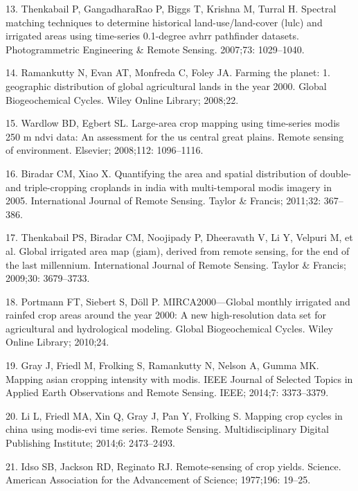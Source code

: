 \documentclass[10pt,letterpaper]{article}
\begin{document}
\hypertarget{ref-thenkabail2007spectral}{}
13. Thenkabail P, GangadharaRao P, Biggs T, Krishna M, Turral H.
Spectral matching techniques to determine historical land-use/land-cover
(lulc) and irrigated areas using time-series 0.1-degree avhrr pathfinder
datasets. Photogrammetric Engineering \& Remote Sensing. 2007;73:
1029--1040.

\hypertarget{ref-ramankutty2008farming}{}
14. Ramankutty N, Evan AT, Monfreda C, Foley JA. Farming the planet: 1.
geographic distribution of global agricultural lands in the year 2000.
Global Biogeochemical Cycles. Wiley Online Library; 2008;22.

\hypertarget{ref-wardlow2008large}{}
15. Wardlow BD, Egbert SL. Large-area crop mapping using time-series
modis 250 m ndvi data: An assessment for the us central great plains.
Remote sensing of environment. Elsevier; 2008;112: 1096--1116.

\hypertarget{ref-biradar2011quantifying}{}
16. Biradar CM, Xiao X. Quantifying the area and spatial distribution of
double-and triple-cropping croplands in india with multi-temporal modis
imagery in 2005. International Journal of Remote Sensing. Taylor \&
Francis; 2011;32: 367--386.

\hypertarget{ref-thenkabail2009global}{}
17. Thenkabail PS, Biradar CM, Noojipady P, Dheeravath V, Li Y, Velpuri
M, et al. Global irrigated area map (giam), derived from remote sensing,
for the end of the last millennium. International Journal of Remote
Sensing. Taylor \& Francis; 2009;30: 3679--3733.

\hypertarget{ref-portmann2010mirca2000}{}
18. Portmann FT, Siebert S, Döll P. MIRCA2000---Global monthly irrigated
and rainfed crop areas around the year 2000: A new high-resolution data
set for agricultural and hydrological modeling. Global Biogeochemical
Cycles. Wiley Online Library; 2010;24.

\hypertarget{ref-gray2014mapping}{}
19. Gray J, Friedl M, Frolking S, Ramankutty N, Nelson A, Gumma MK.
Mapping asian cropping intensity with modis. IEEE Journal of Selected
Topics in Applied Earth Observations and Remote Sensing. IEEE; 2014;7:
3373--3379.

\hypertarget{ref-li2014mapping}{}
20. Li L, Friedl MA, Xin Q, Gray J, Pan Y, Frolking S. Mapping crop
cycles in china using modis-evi time series. Remote Sensing.
Multidisciplinary Digital Publishing Institute; 2014;6: 2473--2493.

\hypertarget{ref-idso1977remote}{}
21. Idso SB, Jackson RD, Reginato RJ. Remote-sensing of crop yields.
Science. American Association for the Advancement of Science; 1977;196:
19--25.
\end{document}
